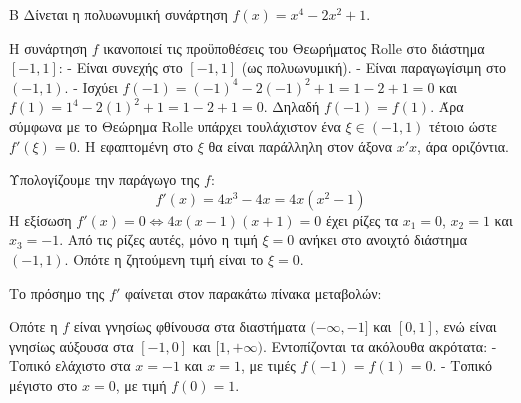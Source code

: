 \begin{thema}{Β}
Δίνεται η πολυωνυμική συνάρτηση $f(x) = x^4 - 2x^2 + 1$.
\begin{erwthma}
\item Η συνάρτηση $f$ ικανοποιεί τις προϋποθέσεις του Θεωρήματος Rolle στο διάστημα $[-1, 1]$:
- Είναι συνεχής στο $[-1, 1]$ (ως πολυωνυμική).
- Είναι παραγωγίσιμη στο $(-1, 1)$.
- Ισχύει $f(-1) = (-1)^4 - 2(-1)^2 + 1 = 1 - 2 + 1 = 0$ και $f(1) = 1^4 - 2(1)^2 + 1 = 1 - 2 + 1 = 0$. Δηλαδή $f(-1) = f(1)$.
Άρα σύμφωνα με το Θεώρημα Rolle υπάρχει τουλάχιστον ένα $\xi \in (-1, 1)$ τέτοιο ώστε $f'(\xi) = 0$. Η εφαπτομένη στο $\xi$ θα είναι παράλληλη στον άξονα $x'x$, άρα οριζόντια.

\item Υπολογίζουμε την παράγωγο της $f$:
\[ f'(x) = 4x^3 - 4x = 4x(x^2 - 1) \]
Η εξίσωση $f'(x) = 0 \Leftrightarrow 4x(x-1)(x+1) = 0$ έχει ρίζες τα $x_1 = 0$, $x_2 = 1$ και $x_3 = -1$.
Από τις ρίζες αυτές, μόνο η τιμή $\xi = 0$ ανήκει στο ανοιχτό διάστημα $(-1, 1)$. Οπότε η ζητούμενη τιμή είναι το $\xi = 0$.

\item Το πρόσημο της $f'$ φαίνεται στον παρακάτω πίνακα μεταβολών:
\begin{center}
\end{center}
Οπότε η $f$ είναι γνησίως φθίνουσα στα διαστήματα $(-\infty, -1]$ και $[0, 1]$, ενώ είναι γνησίως αύξουσα στα $[-1, 0]$ και $[1, +\infty)$.
Εντοπίζονται τα ακόλουθα ακρότατα:
- Τοπικό ελάχιστο στα $x=-1$ και $x=1$, με τιμές $f(-1) = f(1) = 0$.
- Τοπικό μέγιστο στο $x=0$, με τιμή $f(0) = 1$.


\end{erwthma}
\end{thema}
